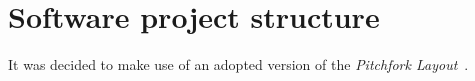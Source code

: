 \section{Software project structure}\label{sec:software-project-structure}

It was decided to make use of an adopted version of the \textit{Pitchfork Layout}~\cite{pitchfork-layout}.
